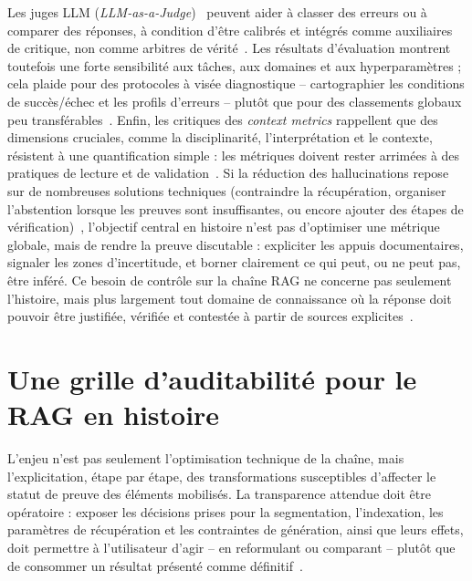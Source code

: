 \documentclass[final, fra]{anthology-ch}     %
\begin{document}
Les juges LLM (\textit{LLM-as-a-Judge})~\cite{zheng2023judging} peuvent aider à classer des erreurs ou à comparer des réponses, à condition d’être calibrés et intégrés comme auxiliaires de critique, non comme arbitres de vérité~\cite{chandak2025answermatching}. 
Les résultats d’évaluation montrent toutefois une forte sensibilité aux tâches, aux domaines et aux hyperparamètres ; cela plaide pour des protocoles à visée diagnostique -- cartographier les conditions de succès/échec et les profils d’erreurs -- plutôt que pour des classements globaux peu transférables~\cite{chen2024benchmarkingrag}. 
Enfin, les critiques des \og \textit{context metrics} \fg{} rappellent que des dimensions cruciales, comme la disciplinarité, l'interprétation et le contexte, résistent à une quantification simple : les métriques doivent rester arrimées à des pratiques de lecture et de validation~\cite{barnett2025somethings}. 
Si la réduction des hallucinations repose sur de nombreuses solutions techniques (contraindre la récupération, organiser l’abstention lorsque les preuves sont insuffisantes, ou encore ajouter des étapes de vérification)~\cite{zhang2025hallucinationmitigation}, l’objectif central en histoire n’est pas d’optimiser une métrique globale, mais de rendre la preuve discutable : expliciter les appuis documentaires, signaler les zones d’incertitude, et borner clairement ce qui peut, ou ne peut pas, être inféré. 
Ce besoin de contrôle sur la chaîne RAG ne concerne pas seulement l’histoire, mais plus largement tout domaine de connaissance où la réponse doit pouvoir être justifiée, vérifiée et contestée à partir de sources explicites~\cite{juhasz2024responsibleragclimate, ozaki2024confidenceRAG, ravi2025exploringtrust}.

\section{Une grille d’auditabilité pour le RAG en histoire}

L’enjeu n’est pas seulement l’optimisation technique de la chaîne, mais l’explicitation, étape par étape, des transformations susceptibles d’affecter le statut de preuve des éléments mobilisés. 
La transparence attendue doit être opératoire : exposer les décisions prises pour la segmentation, l'indexation, les paramètres de récupération et les contraintes de génération, ainsi que leurs effets, doit permettre à l’utilisateur d’agir -- en reformulant ou comparant -- plutôt que de consommer un résultat présenté comme définitif~\cite{ravi2025exploringtrust}.
\end{document}

